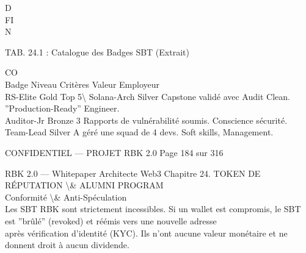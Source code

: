 \documentclass[12pt,landscape,a4paper]{article}
\newenvironment{confidential}
{\begin{tcolorbox}[
    colback=rbkred!5!white,
    colframe=rbkred!75!black,
    title=CONFIDENTIEL,
    fonttitle=\bfseries\color{white},
    coltitle=rbkred!75!black,
    breakable,
    enhanced,
    frame hidden,
    borderline west={2pt}{0pt}{rbkred!75!black}
]}
{\end{tcolorbox}}
\begin{document}
\vspace{0.5em}
\vspace{0.5em}
D\\
FI\\
N\\
\begin{center}\begin{tabular}TAB. 24.1 : Catalogue des Badges SBT (Extrait)\end{tabular}\end{center}
CO\\
Badge       Niveau Critères                           Valeur Employeur\\
RS-Elite    Gold   Top 5\textbackslash{}%
Solana-Arch Silver Capstone validé avec Audit Clean. ”Production-Ready” Engineer.\\
Auditor-Jr Bronze 3 Rapports de vulnérabilité soumis. Conscience sécurité.\\
Team-Lead Silver A géré une squad de 4 devs.          Soft skills, Management.\\
\vspace{0.5em}
\vspace{0.5em}
\vspace{0.5em}
\vspace{0.5em}
\begin{confidential}CONFIDENTIEL — PROJET RBK 2.0                                    Page 184 sur 316\end{confidential}
RBK 2.0 — Whitepaper Architecte Web3                                             Chapitre 24. TOKEN DE RÉPUTATION \textbackslash{}& ALUMNI PROGRAM\\
\vspace{0.5em}
\vspace{0.5em}
Conformité \textbackslash{}& Anti-Spéculation\\
\vspace{0.5em}
Les SBT RBK sont strictement incessibles. Si un wallet est compromis, le SBT est ”brûlé” (revoked) et réémis vers une nouvelle adresse\\
après vérification d’identité (KYC). Ils n’ont aucune valeur monétaire et ne donnent droit à aucun dividende.\\
\vspace{0.5em}
\vspace{0.5em}
\vspace{0.5em}
\end{document}
